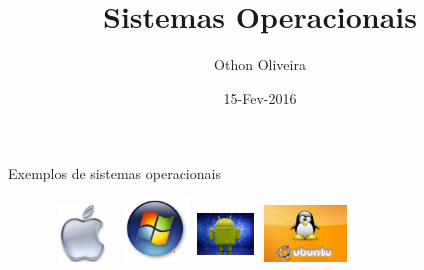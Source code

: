 \documentclass[11pt]{beamer}
\author{Othon Oliveira}
\title{Sistemas Operacionais}
\institute{Fatec -- Faculdade de Informática --- PE}
\date{15-Fev-2016}
\begin{document}
\newcommand{\capa}{
    \begin{tikzpicture}[remember picture,overlay]
        \node at (current page.south west)
            {\begin{tikzpicture}[remember picture, overlay]
                \fill[shading=radial,top color=orange,bottom color=orange,middle color=yellow] (0,0) rectangle (\paperwidth,\paperheight);
            \end{tikzpicture}
          };
    \end{tikzpicture}
}


\begin{frame}
\titlepage
\end{frame}




\begin{frame}{Exemplos de sistemas operacionais}
\begin{figure}[h]
\includegraphics[width=18mm, height=15mm]{Figuras/appleOficial.jpg}
\qquad \quad \quad \quad \quad
\includegraphics[width=19mm, height=17mm]{Figuras/windows.png}
\qquad \quad \quad \quad \quad \quad \quad 	\vspace{1.0in}
\includegraphics[width=15mm, height=15mm]{Figuras/android.jpg}
\qquad \quad \quad \quad \quad \quad \quad \quad 
\includegraphics[width=25mm, height=15mm]{Figuras/ubuntu_904.jpg}

\end{figure}
\end{frame}
\end{document}
